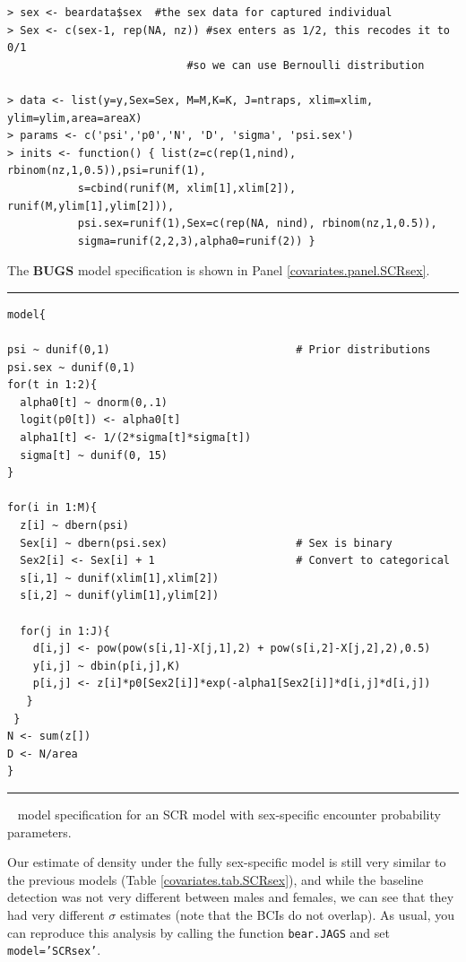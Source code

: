 {\small
\begin{verbatim}
> sex <- beardata$sex  #the sex data for captured individual
> Sex <- c(sex-1, rep(NA, nz)) #sex enters as 1/2, this recodes it to 0/1
                            #so we can use Bernoulli distribution 

> data <- list(y=y,Sex=Sex, M=M,K=K, J=ntraps, xlim=xlim, ylim=ylim,area=areaX)
> params <- c('psi','p0','N', 'D', 'sigma', 'psi.sex')
> inits <- function() { list(z=c(rep(1,nind), rbinom(nz,1,0.5)),psi=runif(1), 
           s=cbind(runif(M, xlim[1],xlim[2]), runif(M,ylim[1],ylim[2])),
           psi.sex=runif(1),Sex=c(rep(NA, nind), rbinom(nz,1,0.5)), 
           sigma=runif(2,2,3),alpha0=runif(2)) }
\end{verbatim}
}
{\flushleft The} {\bf BUGS} model specification is shown in Panel 
\ref{covariates.panel.SCRsex}.

 
\begin{panel}[htp]
\centering
\rule[0.1in]{\textwidth}{.03in}
{\small
\begin{verbatim}
model{

psi ~ dunif(0,1)                             # Prior distributions
psi.sex ~ dunif(0,1)
for(t in 1:2){                             
  alpha0[t] ~ dnorm(0,.1)
  logit(p0[t]) <- alpha0[t]
  alpha1[t] <- 1/(2*sigma[t]*sigma[t])
  sigma[t] ~ dunif(0, 15)
}

for(i in 1:M){
  z[i] ~ dbern(psi)
  Sex[i] ~ dbern(psi.sex)                    # Sex is binary
  Sex2[i] <- Sex[i] + 1                      # Convert to categorical
  s[i,1] ~ dunif(xlim[1],xlim[2])
  s[i,2] ~ dunif(ylim[1],ylim[2])

  for(j in 1:J){
    d[i,j] <- pow(pow(s[i,1]-X[j,1],2) + pow(s[i,2]-X[j,2],2),0.5)
    y[i,j] ~ dbin(p[i,j],K)
    p[i,j] <- z[i]*p0[Sex2[i]]*exp(-alpha1[Sex2[i]]*d[i,j]*d[i,j])
   }
 }
N <- sum(z[])
D <- N/area
}
\end{verbatim}
}

\rule[-0.1in]{\textwidth}{.03in}
\caption{
\jags~ model specification for an SCR model with sex-specific 
encounter probability parameters.}
\label{covariates.panel.SCRsex}
\end{panel}

Our estimate of density under the fully sex-specific model is still
very similar to the previous models (Table
\ref{covariates.tab.SCRsex}), and while the baseline detection was not
very different between males and females, we can see that they had
very different $\sigma$ estimates (note that the BCIs do not overlap).
As usual, you can reproduce this analysis by calling the function 
{\tt bear.JAGS} and set {\tt model='SCRsex'}.

